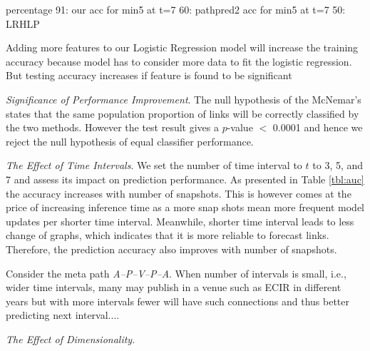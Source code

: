 percentage
91: our acc for min5 at t=7
60: pathpred2 acc for min5 at t=7
50: LRHLP


Adding more features to our Logistic Regression model will increase the training accuracy because model has to consider more data to fit the logistic regression. But testing accuracy increases if feature is found to be significant


\textit{Significance of Performance Improvement}. The null hypothesis of the McNemar's states that the same population proportion of links will be correctly classified by the two methods. However the test result gives a $p$-value $<$ 0.0001 and hence we reject the null hypothesis of equal classifier performance.



%    
%    
%
    
    


\textit{The Effect of Time Intervals}. We set the number of time interval to $t$ to 3, 5, and 7 and assess its impact on prediction performance. As presented in Table \ref{tbl:auc} the accuracy increases with number of snapshots. This is however comes at the price of increasing inference time as a more snap shots mean more frequent model updates per shorter time interval. Meanwhile, shorter time interval leads to less change of graphs, which indicates that it is more reliable to forecast links. Therefore, the prediction accuracy also improves with number of snapshots.

Consider the meta path \textit{A--P--V--P--A}. When number of intervals is small, i.e., wider time intervals, many may publish in a venue such as ECIR in different years but with more intervals fewer will have such connections and thus better predicting next interval....



\textit{The Effect of Dimensionality}.

